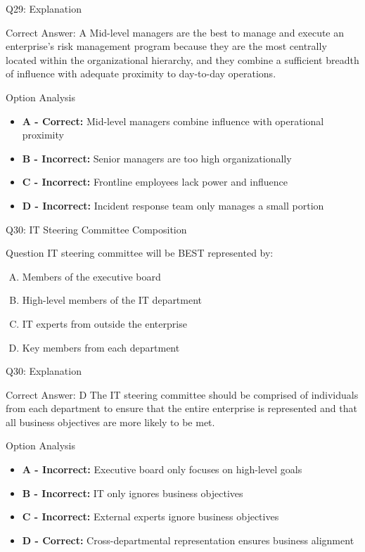 \documentclass{beamer}
\begin{document}
	\begin{frame}{Q29: Explanation}
		\begin{block}{Correct Answer: A}
			Mid-level managers are the best to manage and execute an enterprise's risk management program because they are the most centrally located within the organizational hierarchy, and they combine a sufficient breadth of influence with adequate proximity to day-to-day operations.
		\end{block}
		\begin{block}{Option Analysis}
			\begin{itemize}
				\item \textbf{A - Correct:} Mid-level managers combine influence with operational proximity
				\item \textbf{B - Incorrect:} Senior managers are too high organizationally
				\item \textbf{C - Incorrect:} Frontline employees lack power and influence
				\item \textbf{D - Incorrect:} Incident response team only manages a small portion
			\end{itemize}
		\end{block}
	\end{frame}
	
	\begin{frame}{Q30: IT Steering Committee Composition}
		\begin{block}{Question}
			IT steering committee will be BEST represented by:
		\end{block}
		\begin{enumerate}[(A)]
			\item Members of the executive board
			\item High-level members of the IT department
			\item IT experts from outside the enterprise
			\item Key members from each department
		\end{enumerate}
	\end{frame}
	
	\begin{frame}{Q30: Explanation}
		\begin{block}{Correct Answer: D}
			The IT steering committee should be comprised of individuals from each department to ensure that the entire enterprise is represented and that all business objectives are more likely to be met.
		\end{block}
		\begin{block}{Option Analysis}
			\begin{itemize}
				\item \textbf{A - Incorrect:} Executive board only focuses on high-level goals
				\item \textbf{B - Incorrect:} IT only ignores business objectives
				\item \textbf{C - Incorrect:} External experts ignore business objectives
				\item \textbf{D - Correct:} Cross-departmental representation ensures business alignment
			\end{itemize}
		\end{block}
	\end{frame}
	
\end{document}
